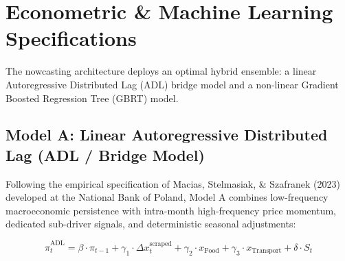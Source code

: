\documentclass[11pt,a4paper]{article}
\begin{document}
\section{Econometric \& Machine Learning Specifications}

The nowcasting architecture deploys an optimal hybrid ensemble: a linear Autoregressive Distributed Lag (ADL) bridge model and a non-linear Gradient Boosted Regression Tree (GBRT) model.

\subsection{Model A: Linear Autoregressive Distributed Lag (ADL / Bridge Model)}

Following the empirical specification of Macias, Stelmasiak, \& Szafranek (2023) developed at the National Bank of Poland, Model A combines low-frequency macroeconomic persistence with intra-month high-frequency price momentum, dedicated sub-driver signals, and deterministic seasonal adjustments:

\begin{formulabox}
\begin{equation}
    \hat{\pi}_{t}^{\text{ADL}} = \beta \cdot \pi_{t-1} + \gamma_1 \cdot \Delta x_t^{\text{scraped}} + \gamma_2 \cdot x_{\text{Food}} + \gamma_3 \cdot x_{\text{Transport}} + \delta \cdot S_t
\end{equation}
\end{formulabox}
\end{document}
